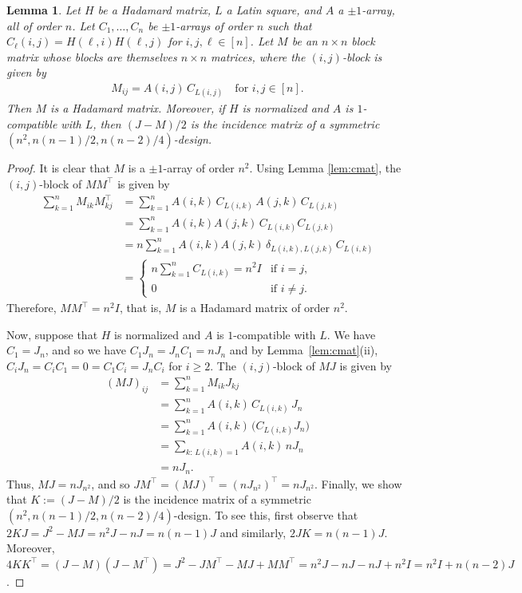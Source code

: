 \documentclass[11pt,oneside]{amsart}
\newtheorem{lemma}[theorem]{Lemma}
\begin{document}
{\begin{lemma}\label{lem:hm} %
Let $H$ be a Hadamard matrix, $L$ a Latin square,  and $A$ a $\pm 1$-array, all of order $n$. Let $C_1,\dots,C_n$ be $\pm 1$-arrays of order $n$ such that $C_\ell (i,j) =H(\ell,i)H(\ell,j)$ for $i,j,\ell\in [n]$. 
Let $M$ be an $n \times n$ block matrix whose blocks are themselves $n \times n$ matrices, where the $(i,j)$-block is given by
\begin{align*}
M_{ij} = A(i,j)\, C_{L(i,j)} \quad \text{for } i,j \in [n].
\end{align*}
Then $M$ is a Hadamard matrix. Moreover, if $H$ is normalized and $A$ is $1$-compatible with $L$, then $(J-M)/2$ is the incidence matrix of a symmetric $(n^2,n(n-1)/2,n(n-2)/4)$-design. 
\end{lemma}
\begin{proof}
    It is clear that $M$ is a   $\pm 1$-array of order $n^2$. Using Lemma \ref{lem:cmat}, the $(i,j)$-block of $MM^\top$ is given by
\begin{align*}
\sum_{k=1}^n M_{ik}M^\top_{kj}
&= \sum_{k=1}^n A(i,k)\,C_{L(i,k)} \, A(j,k)\,C_{L(j,k)} \\
&= \sum_{k=1}^n A(i,k)A(j,k)\, C_{L(i,k)}C_{L(j,k)} \\
&= n \sum_{k=1}^n A(i,k)A(j,k)\, \delta_{L(i,k),L(j,k)}\, C_{L(i,k)} \\
&= \begin{cases}
\displaystyle n \sum_{k=1}^n  C_{L(i,k)} 
= n^2 I & \text{if } i=j,\\[6pt]
0 & \text{if } i \neq j.
\end{cases}
\end{align*}    
    Therefore, $MM^\top=n^2I$, that is, $M$ is a Hadamard matrix of order $n^2$.   
    
 Now, suppose that  $H$ is normalized and $A$ is $1$-compatible with $L$. We have  $C_1=J_n$, and so we have $C_1 J_n=J_n C_1=n J_n$ and by Lemma~\ref{lem:cmat}(ii),  $C_i J_n=C_i C_1 = 0= C_1 C_i=J_n C_i$ for $i\geq 2$. 
   The $(i,j)$-block of $MJ$ is given by 
   \begin{align*}
(MJ)_{ij}
&= \sum_{k=1}^n M_{ik}J_{kj} \\
&= \sum_{k=1}^n A(i,k)\,C_{L(i,k)}\,J_n \\
&= \sum_{k=1}^n A(i,k)\,\big(C_{L(i,k)}J_n\big) \\
&= \sum_{k:\,L(i,k)=1} A(i,k)\,nJ_n \\
&= nJ_n.
\end{align*}
Thus, $MJ=nJ_{n^2}$, and so $JM^\top= (MJ)^\top= (nJ_{n^2})^\top= nJ_{n^2}$.
Finally, we show that $K:=(J-M)/2$ is the incidence matrix of a symmetric $(n^2,n(n-1)/2,n(n-2)/4)$-design.  To see this, first observe that $2KJ=J^2-MJ= n^2 J-nJ=n(n-1) J$ and similarly, $2JK=n(n-1)  J$. Moreover, $4 KK^\top= (J-M)(J-M^\top) =J^2 - JM^\top - MJ + MM^\top = n^2J - nJ - nJ + n^2I = n^2 I + n(n-2)J$.    
\end{proof}




}
\end{document}
